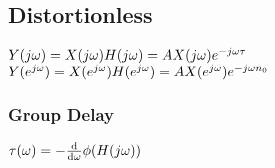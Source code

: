 \subsection*{Distortionless}

$Y(j\omega) = X(j\omega) H(j\omega) = AX(j\omega) e^{-j\omega \tau}$\\
$Y(e^{j\omega}) = X(e^{j\omega}) H(e^{j\omega}) = AX(e^{j\omega}) e^{-j\omega n_0}$
\subsubsection*{Group Delay}

$\tau(\omega)=-\frac{\mathrm{d}}{\mathrm{d}\omega} \phi(H(j\omega))$